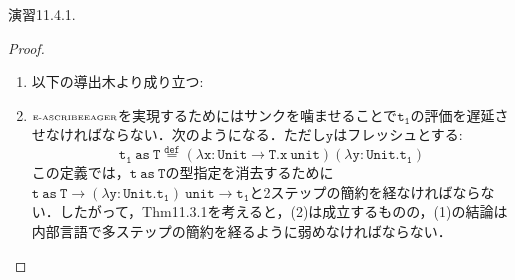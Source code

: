 \documentclass[9pt]{beamer}
\begin{document}
\begin{frame}{演習11.4.1.}
\begin{proof}
\begin{enumerate}
\item 以下の導出木より成り立つ:\begin{prooftree}
\end{prooftree}
\item $\text{\tiny\rm{E-ASCRIBEEAGER}}$を実現するためにはサンクを噛ませることで$\mathtt{t_{1}}$の評価を遅延させなければならない．次のようになる．ただし$\mathtt{y}$はフレッシュとする:\begin{equation*}
\mathtt{t_{1}\ as\ T \stackrel{def}{=} (\lambda x: Unit\rightarrow T. x\ unit)(\lambda y:Unit.  t_{1})}
\end{equation*}
この定義では，$\mathtt{t\ as\ T}$の型指定を消去するために$\mathtt{t\ as\ T\rightarrow (\lambda y : Unit. t_{1})\ unit\rightarrow t_{1}}$と2ステップの簡約を経なければならない．したがって，Thm11.3.1を考えると，(2)は成立するものの，(1)の結論は内部言語で多ステップの簡約を経るように弱めなければならない．
\end{enumerate}
\end{proof}
\end{frame}
\end{document}
